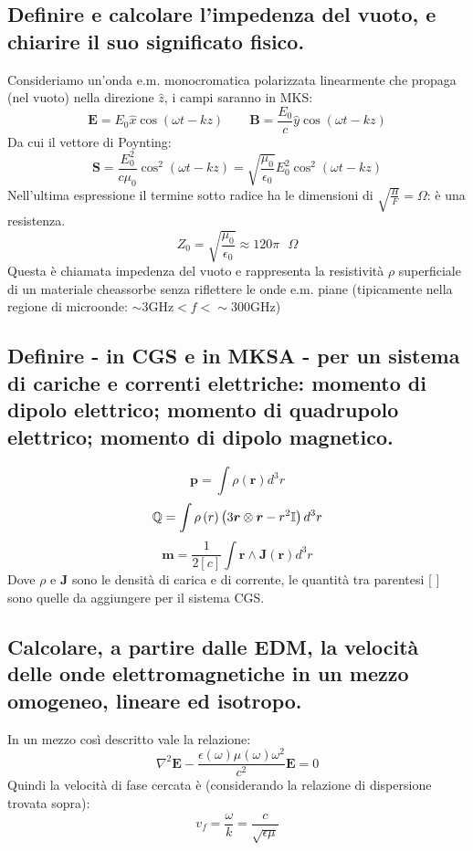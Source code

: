 \subsection[]{ Definire e calcolare l'impedenza del vuoto, e chiarire il suo significato fisico. }
Consideriamo un'onda e.m. monocromatica polarizzata linearmente che propaga (nel vuoto) nella direzione $\hat{z}$, i campi saranno in MKS:
\[
	\boldsymbol{E} = E_{0} \hat{x} \cos\left( \omega t - kz \right) \quad \quad
	\boldsymbol{B} = \frac{E_{0}}{c} \hat{y} \cos\left( \omega t - kz \right) 
\] 
Da cui il vettore di Poynting:
\[
	\boldsymbol{S} = \frac{E_{0}^2}{c \mu_{0}}\cos^2\left( \omega t - kz \right) = \sqrt{\frac{\mu_0}{\epsilon_0}}E_0^2 \cos^2\left( \omega t - kz \right)   
\] 
Nell'ultima espressione il termine sotto radice ha le dimensioni di $\sqrt{\frac{H}{F}} = \Omega$: è una resistenza.  
\[
	Z_{0} = \sqrt{\frac{\mu_{0}}{\epsilon_0}} \approx 120 \pi \text{ }\Omega
\]
Questa è chiamata impedenza del vuoto e rappresenta la resistività $\rho$ superficiale di un materiale cheassorbe senza riflettere le onde e.m. piane (tipicamente nella regione di microonde: $\sim 3 \text{GHz} < f < \sim 300 \text{GHz}$) 

\subsection[]{ Definire - in CGS e in MKSA - per un sistema di cariche e correnti elettriche: momento di dipolo elettrico; momento di quadrupolo elettrico;  momento di dipolo magnetico.}
\[
	\boldsymbol{p} = \int \rho \left( \boldsymbol{r} \right) d^{3}r     
\] 
\[
	\mathbb{Q} = \int \rho \left( r \right) \left( 3 \boldsymbol{r} \otimes \boldsymbol{r} -  r^2 \mathbb{I}  \right) d^3 r 
\] 
\[
	\boldsymbol{m} = \frac{1}{2[c]}\int \boldsymbol{r} \wedge \boldsymbol{J}\left(\boldsymbol{r}\right) d^3r
\] 
Dove $\rho$ e  $\boldsymbol{J}$ sono le densità di carica e di corrente, le quantità tra parentesi [ ] sono quelle da aggiungere per il sistema CGS.

\subsection[]{ Calcolare, a partire dalle EDM, la velocità delle onde elettromagnetiche in un mezzo omogeneo, lineare ed isotropo.}
In un mezzo così descritto vale la relazione:
\[
	\nabla^{2}\boldsymbol{E} - \frac{\epsilon\left( \omega \right) \mu \left( \omega \right) \omega^{2}}{c^{2}}\boldsymbol{E} = 0 
\] 
Quindi la velocità di fase cercata è (considerando la relazione di dispersione trovata sopra):
\[
v_{f} = \frac{\omega}{k} =  \frac{c}{\sqrt{\epsilon \mu} }
\] 

